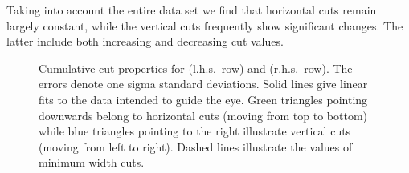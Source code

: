 		Taking into account the entire data set we find that horizontal cuts remain largely constant, while the vertical cuts frequently show significant changes. The latter include both increasing and decreasing cut values.

		\begin{figure}
			\centering
			\qquad
			\newline
			\qquad
			\newline
			\qquad
			
			\caption[Cut properties]{Cumulative cut properties for  (l.h.s.\ row) and  (r.h.s.\ row). The errors denote one sigma standard deviations. Solid lines give linear fits to the data intended to guide the eye. Green triangles pointing downwards belong to horizontal cuts (moving from top to bottom) while blue triangles pointing to the right illustrate vertical cuts (moving from left to right). Dashed lines illustrate the values of minimum width cuts.}
			\label{fig:cuts}
		\end{figure}

